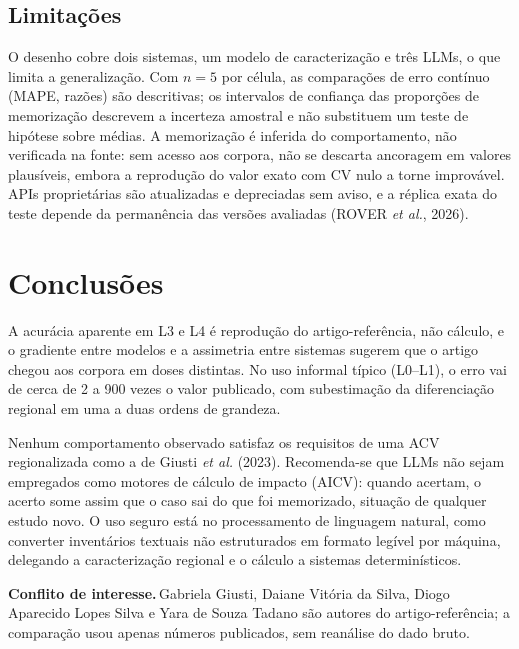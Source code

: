 \documentclass[12pt,a4paper]{article}
\begin{document}
\subsection{Limitações}

O desenho cobre dois sistemas, um modelo de caracterização e três LLMs, o que limita a generalização. Com $n=5$ por célula, as comparações de erro contínuo (MAPE, razões) são descritivas; os intervalos de confiança das proporções de memorização descrevem a incerteza amostral e não substituem um teste de hipótese sobre médias. A memorização é inferida do comportamento, não verificada na fonte: sem acesso aos corpora, não se descarta ancoragem em valores plausíveis, embora a reprodução do valor exato com CV nulo a torne improvável. APIs proprietárias são atualizadas e depreciadas sem aviso, e a réplica exata do teste depende da permanência das versões avaliadas (ROVER \emph{et al.}, 2026).

\section{Conclusões}

A acurácia aparente em L3 e L4 é reprodução do artigo-referência, não cálculo, e o gradiente entre modelos e a assimetria entre sistemas sugerem que o artigo chegou aos corpora em doses distintas. No uso informal típico (L0--L1), o erro vai de cerca de 2 a 900 vezes o valor publicado, com subestimação da diferenciação regional em uma a duas ordens de grandeza.

Nenhum comportamento observado satisfaz os requisitos de uma ACV regionalizada como a de Giusti \emph{et al.} (2023). Recomenda-se que LLMs não sejam empregados como motores de cálculo de impacto (AICV): quando acertam, o acerto some assim que o caso sai do que foi memorizado, situação de qualquer estudo novo. O uso seguro está no processamento de linguagem natural, como converter inventários textuais não estruturados em formato legível por máquina, delegando a caracterização regional e o cálculo a sistemas determinísticos.

\vspace{0.3\baselineskip}

\noindent\textbf{\footnotesize Conflito de interesse.}\,{\footnotesize Gabriela Giusti, Daiane Vitória da Silva, Diogo Aparecido Lopes Silva e Yara de Souza Tadano são autores do artigo-referência; a comparação usou apenas números publicados, sem reanálise do dado bruto.}
\end{document}
